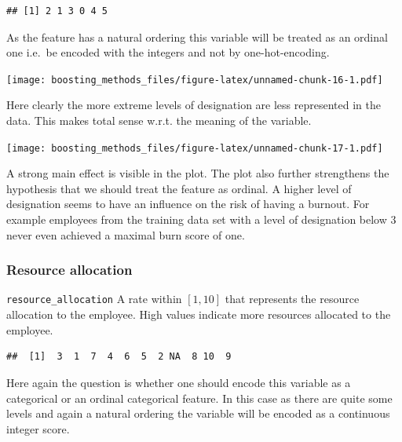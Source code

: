 \documentclass[
]{book}
\newenvironment{Shaded}{\begin{snugshade}}{\end{snugshade}}
\newcommand{\CommentTok}[1]{\textcolor[rgb]{0.56,0.35,0.01}{\textit{#1}}}
\newcommand{\FunctionTok}[1]{\textcolor[rgb]{0.00,0.00,0.00}{#1}}
\newcommand{\NormalTok}[1]{#1}
\newcommand{\SpecialCharTok}[1]{\textcolor[rgb]{0.00,0.00,0.00}{#1}}
\begin{document}
\begin{verbatim}
## [1] 2 1 3 0 4 5
\end{verbatim}

As the feature has a natural ordering this variable will be treated as an ordinal one i.e.~be encoded with the integers and not by one-hot-encoding.

\texttt{[image: boosting\_methods\_files/figure-latex/unnamed-chunk-16-1.pdf]}

Here clearly the more extreme levels of designation are less represented in the data. This makes total sense w.r.t. the meaning of the variable.

\texttt{[image: boosting\_methods\_files/figure-latex/unnamed-chunk-17-1.pdf]}

A strong main effect is visible in the plot. The plot also further strengthens the hypothesis that we should treat the feature as ordinal. A higher level of designation seems to have an influence on the risk of having a burnout. For example employees from the training data set with a level of designation below 3 never even achieved a maximal burn score of one.

\hypertarget{resource-allocation}{%
\subsubsection{Resource allocation}\label{resource-allocation}}

\texttt{resource\_allocation} A rate within \([1,10]\) that represents the resource allocation to the employee. High values indicate more resources allocated to the employee.

\begin{Shaded}
\end{Shaded}

\begin{verbatim}
##  [1]  3  1  7  4  6  5  2 NA  8 10  9
\end{verbatim}

Here again the question is whether one should encode this variable as a categorical or an ordinal categorical feature. In this case as there are quite some levels and again a natural ordering the variable will be encoded as a continuous integer score.
\end{document}
